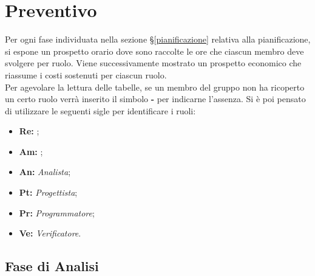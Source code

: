 \section{Preventivo}
\label{preventivo}
Per ogni fase individuata nella sezione \S\ref{pianificazione} relativa alla pianificazione, si espone un prospetto orario dove sono raccolte le ore che ciascun membro deve svolgere per ruolo. Viene successivamente mostrato un prospetto economico che riassume i costi sostenuti per ciascun ruolo.\\
Per agevolare la lettura delle tabelle, se un membro del gruppo non ha ricoperto un certo ruolo verrà inserito il simbolo \textbf{-} per indicarne l'assenza. Si è poi pensato di utilizzare le seguenti sigle per identificare i ruoli:
\begin{itemize}
\item \textbf{Re:} \textit{\Responsabile};
\item \textbf{Am:} \textit{\Amministratore};
\item \textbf{An:} \textit{Analista};
\item \textbf{Pt:} \textit{Progettista};
\item \textbf{Pr:} \textit{Programmatore};
\item \textbf{Ve:} \textit{Verificatore}.
\end{itemize}

\subsection{Fase di Analisi}
